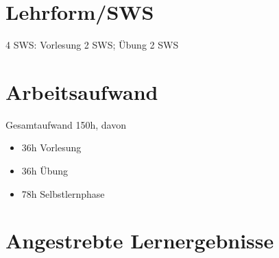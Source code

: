 \hypertarget{lehrformswspathlabelmi-2017modulbeschreibungen-bachelorba_theoretischeinformatik1}{%
\section*{Lehrform/SWS\label{/mi-2017/modulbeschreibungen-bachelor/BA_TheoretischeInformatik1}}\label{lehrformswspathlabelmi-2017modulbeschreibungen-bachelorba_theoretischeinformatik1}}

4 SWS: Vorlesung 2 SWS; Übung 2 SWS

\hypertarget{arbeitsaufwandpathlabelmi-2017modulbeschreibungen-bachelorba_theoretischeinformatik1}{%
\section*{Arbeitsaufwand\label{/mi-2017/modulbeschreibungen-bachelor/BA_TheoretischeInformatik1}}\label{arbeitsaufwandpathlabelmi-2017modulbeschreibungen-bachelorba_theoretischeinformatik1}}

Gesamtaufwand 150h, davon

\begin{itemize}
\tightlist
\item
  36h Vorlesung
\item
  36h Übung
\item
  78h Selbstlernphase
\end{itemize}

\hypertarget{angestrebte-lernergebnissepathlabelmi-2017modulbeschreibungen-bachelorba_theoretischeinformatik1}{%
\section*{Angestrebte
Lernergebnisse\label{/mi-2017/modulbeschreibungen-bachelor/BA_TheoretischeInformatik1}}\label{angestrebte-lernergebnissepathlabelmi-2017modulbeschreibungen-bachelorba_theoretischeinformatik1}}

